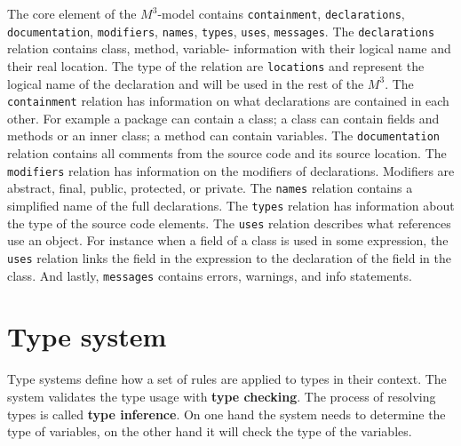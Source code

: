 \documentclass[../main.tex]{subfiles}
\begin{document}
    The core element of the $M^3$-model contains \texttt{containment}, \texttt{declarations}, \texttt{documentation}, \texttt{modifiers}, \texttt{names}, \texttt{types}, \texttt{uses}, \texttt{messages}.
    The \texttt{declarations} relation contains class, method, variable- information with their logical name and their real location. The type of the relation are \texttt{locations} and represent the logical name of the declaration and will be used in the rest of the $M^3$.
    The \texttt{containment} relation has information on what declarations are contained in each other. For example a package can contain a class; a class can contain fields and methods or an inner class; a method can contain variables.    
    The \texttt{documentation} relation contains all comments from the source code and its source location.
    The \texttt{modifiers} relation has information on the modifiers of declarations. Modifiers are abstract, final, public, protected, or private.
    The \texttt{names} relation contains a simplified name of the full declarations.
    The \texttt{types} relation has information about the type of the source code elements.
    The \texttt{uses} relation describes what references use an object. For instance when a field of a class is used in some expression, the \texttt{uses} relation links the field in the expression to the declaration of the field in the class.
    And lastly, \texttt{messages} contains errors, warnings, and info statements.
    
    \section{Type system}\label{sec:background_type-system}
    Type systems define how a set of rules are applied to types in their context.
    The system validates the type usage with \textbf{type checking}.
    The process of resolving types is called \textbf{type inference}.
    On one hand the system needs to determine the type of variables, on the other hand it will check the type of the variables.
    
\end{document}
